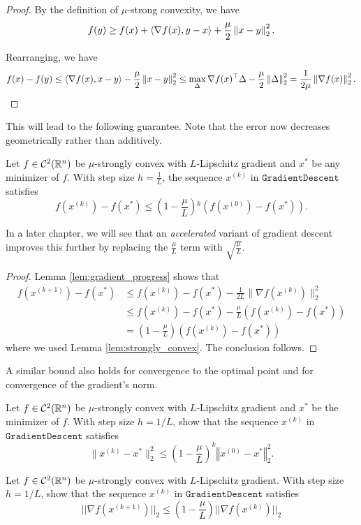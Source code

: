 \begin{proof}
By the definition of $\mu$-strong convexity, we have 
\[
f(y)\ge f(x)+\langle\nabla f(x),y-x\rangle+\frac{\mu}{2}\left\Vert x-y\right\Vert^{2}_{2}.
\]

Rearranging, we have 
\[
f(x)-f(y)\le\langle\nabla f(x),x-y\rangle-\frac{\mu}{2}\left\Vert x-y\right\Vert^{2}_{2}\le\max_{\Delta}\nabla f(x)^{\top}\Delta-\frac{\mu}{2}\left\Vert \Delta\right\Vert^{2}_{2}=\frac{1}{2\mu}\left\Vert \nabla f(x)\right\Vert^{2}_{2}.
\]
\end{proof}
This will lead to the following guarantee. Note that the error now
decreases geometrically rather than additively.
\begin{thm}
\label{thm:gd_convex_strongly}Let $f\in\mathcal{C}^{2}(\mathbb{R}^{n})$
be $\mu$-strongly convex with $L$-Lipschitz gradient and $x^{*}$
be any minimizer of $f$. With step size $h=\frac{1}{L}$, the sequence
$x^{(k)}$ in $\mathtt{GradientDescent}$ satisfies
\[
f(x^{(k)})-f(x^{*})\leq\left(1-\frac{\mu}{L}\right){}^{k}\left(f(x^{(0)})-f(x^{*})\right).
\]
\end{thm}

In a later chapter, we will see that an \emph{accelerated }variant
of gradient descent improves this further by replacing the $\frac{\mu}{L}$
term with $\sqrt{\frac{\mu}{L}}$.
\begin{proof}
Lemma \ref{lem:gradient_progress} shows that
\begin{align}
f(x^{(k+1)})-f(x^{*}) & \leq f(x^{(k)})-f(x^{*})-\frac{1}{2L}\|\nabla f(x^{(k)})\|^{2}_{2}\label{eq:strong_convex_progress}\\
 & \le f(x^{(k)})-f(x^{*})-\frac{\mu}{L}\left(f(x^{(k)})-f(x^{*})\right)\\
 & =\left(1-\frac{\mu}{L}\right)\left(f(x^{(k)})-f(x^{*})\right)
\end{align}
where we used Lemma \ref{lem:strongly_convex}. The conclusion follows.
\end{proof}
A similar bound also holds for convergence to the optimal point and
for convergence of the gradient's norm. 
\begin{xca}
Let $f\in\mathcal{C}^{2}(\mathbb{R}^{n})$ be $\mu$-strongly convex with
$L$-Lipschitz gradient and $x^{*}$ be the minimizer of $f$. With
step size $h=1/L$, show that the sequence $x^{(k)}$ in $\mathtt{GradientDescent}$
satisfies 
\[
\|x^{(k)}-x^{*}\|^{2}_{2}\le\left(1-\frac{\mu}{L}\right)^{k}\left\Vert x^{(0)}-x^{*}\right\Vert ^{2}_{2}.
\]
\end{xca}

\begin{xca}
Let $f\in\mathcal{C}^{2}(\mathbb{R}^{n})$ be $\mu$-strongly convex with
$L$-Lipschitz gradient. With step size $h=1/L$, show that the sequence
$x^{(k)}$ in $\mathtt{GradientDescent}$ satisfies
\[
||\nabla f(x^{(k+1)})||_{2}\leq\left(1-\frac{\mu}{L}\right)||\nabla f(x^{(k)})||_{2}
\]
\end{xca}

